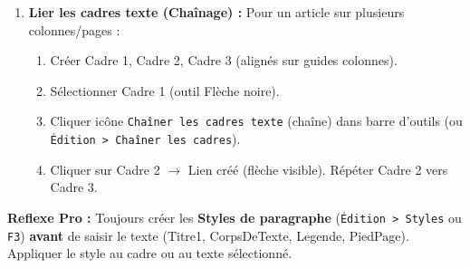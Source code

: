 \documentclass[11pt]{article}
\begin{document}
\begin{methode}
\begin{enumerate}
        \item \textbf{Lier les cadres texte (Chaînage) :} Pour un article sur plusieurs colonnes/pages :
              \begin{enumerate}
                  \item Créer Cadre 1, Cadre 2, Cadre 3 (alignés sur guides colonnes).
                  \item Sélectionner Cadre 1 (outil Flèche noire).
                  \item Cliquer icône \texttt{Chaîner les cadres texte} (chaîne) dans barre d'outils (ou \texttt{Édition > Chaîner les cadres}).
                  \item Cliquer sur Cadre 2 $\rightarrow$ Lien créé (flèche visible). Répéter Cadre 2 vers Cadre 3.
              \end{enumerate}
    \end{enumerate}
    \textbf{Reflexe Pro :} Toujours créer les \textbf{Styles de paragraphe} (\texttt{Édition > Styles} ou \texttt{F3}) \textbf{avant} de saisir le texte (Titre1, CorpsDeTexte, Legende, PiedPage). Appliquer le style au cadre ou au texte sélectionné.
\end{methode}
\end{document}

